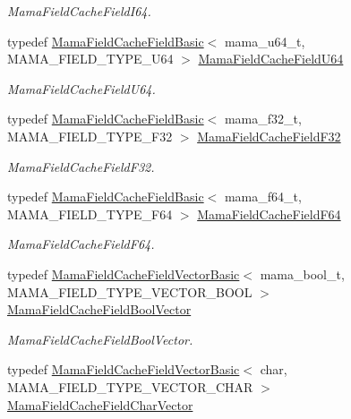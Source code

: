 \begin{DoxyCompactItemize}
\begin{DoxyCompactList}\small\item\em MamaFieldCacheFieldI64. \item\end{DoxyCompactList}\item 
typedef \hyperlink{classWombat_1_1MamaFieldCacheFieldBasic}{MamaFieldCacheFieldBasic}$<$ mama\_\-u64\_\-t, MAMA\_\-FIELD\_\-TYPE\_\-U64 $>$ \hyperlink{namespaceWombat_a1f9d25b2188427d7cb1ea35d3f859317}{MamaFieldCacheFieldU64}
\begin{DoxyCompactList}\small\item\em MamaFieldCacheFieldU64. \item\end{DoxyCompactList}\item 
typedef \hyperlink{classWombat_1_1MamaFieldCacheFieldBasic}{MamaFieldCacheFieldBasic}$<$ mama\_\-f32\_\-t, MAMA\_\-FIELD\_\-TYPE\_\-F32 $>$ \hyperlink{namespaceWombat_a85192df0d07ffb481d6fbd851609779b}{MamaFieldCacheFieldF32}
\begin{DoxyCompactList}\small\item\em MamaFieldCacheFieldF32. \item\end{DoxyCompactList}\item 
typedef \hyperlink{classWombat_1_1MamaFieldCacheFieldBasic}{MamaFieldCacheFieldBasic}$<$ mama\_\-f64\_\-t, MAMA\_\-FIELD\_\-TYPE\_\-F64 $>$ \hyperlink{namespaceWombat_a235c17651452d8c4355bfdd8f5f52aa1}{MamaFieldCacheFieldF64}
\begin{DoxyCompactList}\small\item\em MamaFieldCacheFieldF64. \item\end{DoxyCompactList}\item 
typedef \hyperlink{classWombat_1_1MamaFieldCacheFieldVectorBasic}{MamaFieldCacheFieldVectorBasic}$<$ mama\_\-bool\_\-t, MAMA\_\-FIELD\_\-TYPE\_\-VECTOR\_\-BOOL $>$ \hyperlink{namespaceWombat_ad450c3d0cc7be4e3a34507cdaaf9ee1f}{MamaFieldCacheFieldBoolVector}
\begin{DoxyCompactList}\small\item\em MamaFieldCacheFieldBoolVector. \item\end{DoxyCompactList}\item 
typedef \hyperlink{classWombat_1_1MamaFieldCacheFieldVectorBasic}{MamaFieldCacheFieldVectorBasic}$<$ char, MAMA\_\-FIELD\_\-TYPE\_\-VECTOR\_\-CHAR $>$ \hyperlink{namespaceWombat_a139860e29608224eb3f56272c16272e1}{MamaFieldCacheFieldCharVector}

\end{DoxyCompactItemize}
